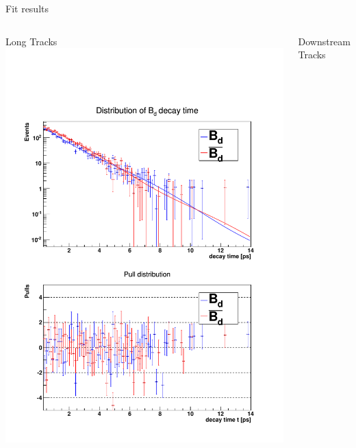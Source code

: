 \documentclass{beamer}
\begin{document}
	
	\begin{frame}{Fit results}
	\begin{columns}
	\begin{block}{Long Tracks}
	\includegraphics[width=\textwidth]{decay_distribution_lt}
	\end{block}
	\begin{block}{Downstream Tracks}

\end{block}
\end{columns}
\end{frame}
\end{document}
